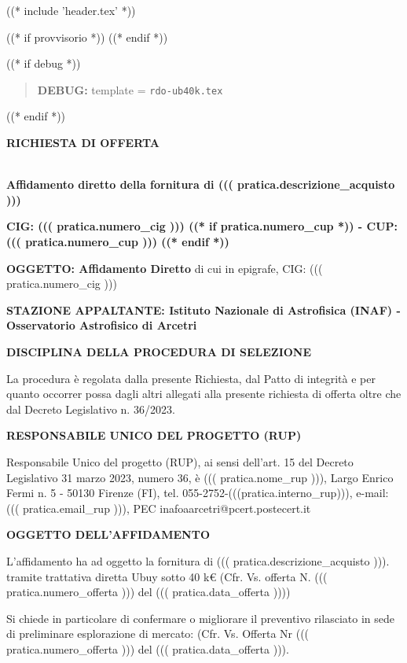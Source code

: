 
((* include 'header.tex' *))

((* if provvisorio *))
((* endif *))



\topaddr

((* if debug *))
\begin{quotation}
	\textbf{DEBUG:} template = \texttt{rdo-ub40k.tex}
\end{quotation}
((* endif *))

\begin{center}
\textbf{RICHIESTA DI OFFERTA}
\end{center}

~\\
\textbf{Affidamento diretto della fornitura di ((( pratica.descrizione_acquisto )))}

\textbf{CIG: ((( pratica.numero_cig )))
((* if pratica.numero_cup *)) - CUP: ((( pratica.numero_cup ))) ((* endif *))}

\textbf{OGGETTO: Affidamento Diretto} di cui in epigrafe, CIG: ((( pratica.numero_cig )))

\textbf{STAZIONE APPALTANTE: Istituto Nazionale di Astrofisica (INAF) - Osservatorio Astrofisico di Arcetri}

\textbf{DISCIPLINA DELLA PROCEDURA DI SELEZIONE}

La procedura è regolata dalla presente Richiesta, dal Patto di integrità
e per quanto occorrer possa dagli altri allegati alla presente richiesta
di offerta oltre che dal Decreto Legislativo n. 36/2023.


\textbf{RESPONSABILE UNICO DEL PROGETTO (RUP)}

Responsabile Unico del progetto (RUP), ai sensi dell'art. 15 del
Decreto Legislativo 31 marzo 2023, numero 36, è
 ((( pratica.nome_rup ))), Largo Enrico Fermi n. 5 - 50130 Firenze
 (FI), tel. 055-2752-(((pratica.interno_rup))),
e-mail: ((( pratica.email_rup ))), PEC inafoaarcetri@pcert.postecert.it


\textbf{OGGETTO DELL'AFFIDAMENTO}

L'affidamento ha ad oggetto la fornitura di  ((( pratica.descrizione_acquisto ))).
tramite trattativa diretta Ubuy sotto 40 k\euro
(Cfr. Vs. offerta N. ((( pratica.numero_offerta ))) del ((( pratica.data_offerta ))){)}

Si chiede in particolare di confermare o migliorare il preventivo
rilasciato in sede di preliminare esplorazione di mercato: 
(Cfr. Vs. Offerta Nr ((( pratica.numero_offerta ))) del ((( pratica.data_offerta ))).

